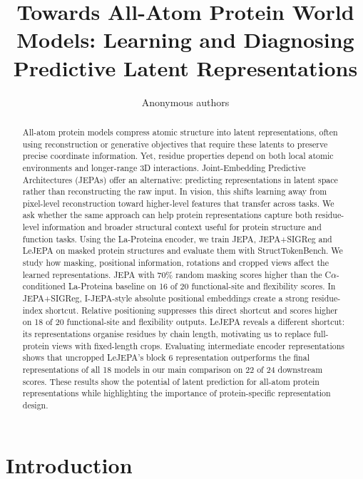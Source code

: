 \documentclass{article}
\title{Towards All-Atom Protein World Models: Learning and Diagnosing Predictive Latent Representations}
\author{Anonymous authors}
\begin{document}
\maketitle

\begin{abstract}
All-atom protein models compress atomic structure into latent representations, often using reconstruction or generative objectives that require these latents to preserve precise coordinate information. Yet, residue properties depend on both local atomic environments and longer-range 3D interactions. Joint-Embedding Predictive Architectures (JEPAs) offer an alternative: predicting representations in latent space rather than reconstructing the raw input. In vision, this shifts learning away from pixel-level reconstruction toward higher-level features that transfer across tasks. We ask whether the same approach can help protein representations capture both residue-level information and broader structural context useful for protein structure and function tasks. Using the La-Proteina encoder, we train JEPA, JEPA+SIGReg and LeJEPA on masked protein structures and evaluate them with StructTokenBench. We study how masking, positional information, rotations and cropped views affect the learned representations. JEPA with 70\% random masking scores higher than the C$\alpha$-conditioned La-Proteina baseline on 16 of 20 functional-site and flexibility scores. In JEPA+SIGReg, I-JEPA-style absolute positional embeddings create a strong residue-index shortcut. Relative positioning suppresses this direct shortcut and scores higher on 18 of 20 functional-site and flexibility outputs. LeJEPA reveals a different shortcut: its representations organise residues by chain length, motivating us to replace full-protein views with fixed-length crops. Evaluating intermediate encoder representations shows that uncropped LeJEPA's block 6 representation outperforms the final representations of all 18 models in our main comparison on 22 of 24 downstream scores. These results show the potential of latent prediction for all-atom protein representations while highlighting the importance of protein-specific representation design.
\end{abstract}

\section{Introduction}
\label{sec:introduction}
\end{document}
